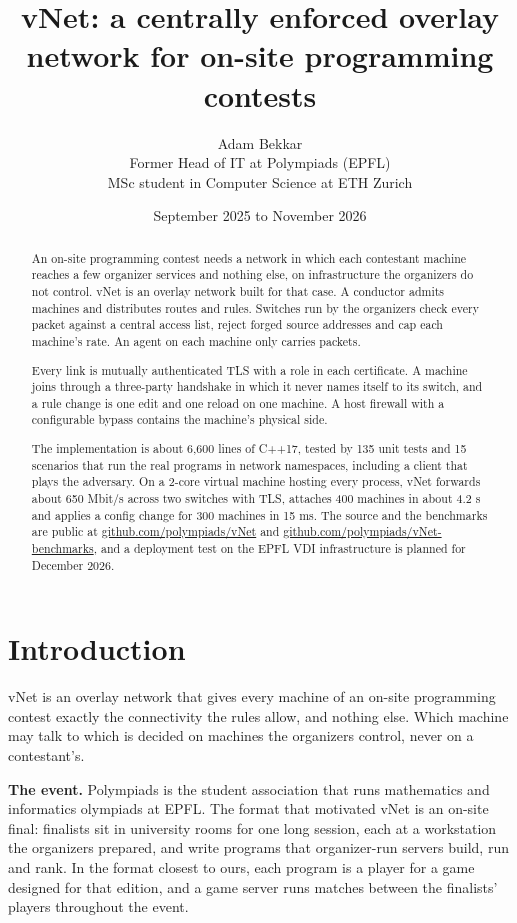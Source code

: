 \documentclass[11pt,a4paper]{article}
\title{\sffamily\bfseries vNet: a centrally enforced overlay network for on-site programming contests}
\author{Adam Bekkar\\[0.4em]
\normalsize Former Head of IT at Polympiads (EPFL)\\
\normalsize MSc student in Computer Science at ETH Zurich}
\date{September 2025 to November 2026}
\begin{document}
\maketitle

\begin{abstract}
An on-site programming contest needs a network in which each contestant machine reaches a few organizer services and nothing else, on infrastructure the organizers do not control. vNet is an overlay network built for that case. A conductor admits machines and distributes routes and rules. Switches run by the organizers check every packet against a central access list, reject forged source addresses and cap each machine's rate. An agent on each machine only carries packets.

Every link is mutually authenticated TLS with a role in each certificate. A machine joins through a three-party handshake in which it never names itself to its switch, and a rule change is one edit and one reload on one machine. A host firewall with a configurable bypass contains the machine's physical side.

The implementation is about 6,600 lines of C++17, tested by 135 unit tests and 15 scenarios that run the real programs in network namespaces, including a client that plays the adversary. On a 2-core virtual machine hosting every process, vNet forwards about 650 Mbit/s across two switches with TLS, attaches 400 machines in about 4.2 s and applies a config change for 300 machines in 15 ms. The source and the benchmarks are public at \href{https://github.com/polympiads/vNet}{github.com/polympiads/vNet} and \href{https://github.com/polympiads/vNet-benchmarks}{github.com/polympiads/vNet-benchmarks}, and a deployment test on the EPFL VDI infrastructure is planned for December 2026.
\end{abstract}

\hypertarget{introduction}{%
\section{Introduction}\label{introduction}}

vNet is an overlay network that gives every machine of an on-site programming contest exactly the connectivity the rules allow, and nothing else. Which machine may talk to which is decided on machines the organizers control, never on a contestant's.

\textbf{The event.} Polympiads is the student association that runs mathematics and informatics olympiads at EPFL. The format that motivated vNet is an on-site final: finalists sit in university rooms for one long session, each at a workstation the organizers prepared, and write programs that organizer-run servers build, run and rank. In the format closest to ours, each program is a player for a game designed for that edition, and a game server runs matches between the finalists' players throughout the event.
\end{document}
